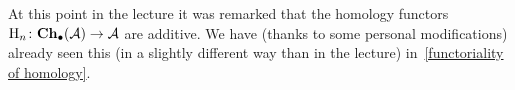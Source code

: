 \begin{remark}
  At this point in the lecture it was remarked that the homology functors~$\operatorname{H}_n \colon \mathbf{Ch}_\bullet(\mathcal{A}) \to \mathcal{A}$ are additive.
  We have (thanks to some personal modifications) already seen this (in a slightly different way than in the lecture) in~\cref{functoriality of homology}.
%   

\end{remark}
